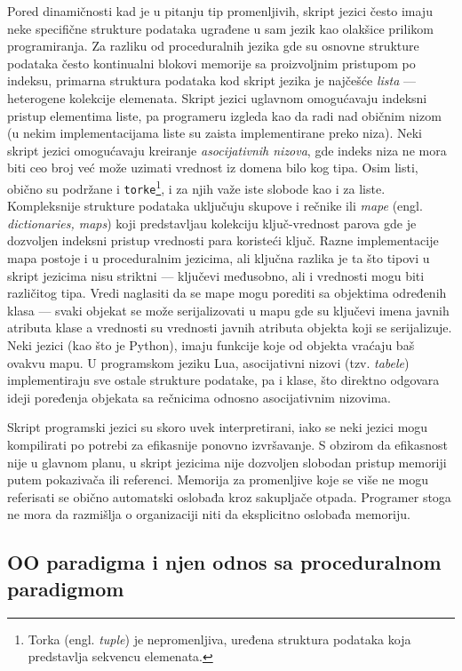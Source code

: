 Pored dinamičnosti kad je u pitanju tip promenljivih, skript jezici često imaju neke specifične strukture podataka ugrađene u sam jezik kao olakšice prilikom programiranja. Za razliku od proceduralnih jezika gde su osnovne strukture podataka često kontinualni blokovi memorije sa proizvoljnim pristupom po indeksu, primarna struktura podataka kod skript jezika je najčešće \emph{lista} --- heterogene kolekcije elemenata. Skript jezici uglavnom omogućavaju indeksni pristup elementima liste, pa programeru izgleda kao da radi nad običnim nizom (u nekim implementacijama liste su zaista implementirane preko niza). Neki skript jezici omogućavaju kreiranje \emph{asocijativnih nizova}, gde indeks niza ne mora biti ceo broj već može uzimati vrednost iz domena bilo kog tipa. Osim listi, obično su podržane i \texttt{torke}\footnote{Torka (engl. \emph{tuple}) je nepromenljiva, uređena struktura podataka koja predstavlja sekvencu elemenata.}, i za njih važe iste slobode kao i za liste. Kompleksnije strukture podataka uključuju skupove i rečnike ili \emph{mape} (engl. \emph{dictionaries, maps}) koji predstavljau kolekciju ključ-vrednost parova gde je dozvoljen indeksni pristup vrednosti para koristeći ključ. Razne implementacije mapa postoje i u proceduralnim jezicima, ali ključna razlika je ta što tipovi u skript jezicima nisu striktni --- ključevi međusobno, ali i vrednosti mogu biti različitog tipa. Vredi naglasiti da se mape mogu porediti sa objektima određenih klasa --- svaki objekat se može serijalizovati u mapu gde su ključevi imena javnih atributa klase a vrednosti su vrednosti javnih atributa objekta koji se serijalizuje. Neki jezici (kao što je Python), imaju funkcije koje od objekta vraćaju baš ovakvu mapu. U programskom jeziku Lua, asocijativni nizovi (tzv. \emph{tabele}) implementiraju sve ostale strukture podatake, pa i klase, što direktno odgovara ideji poređenja objekata sa rečnicima odnosno asocijativnim nizovima.

Skript programski jezici su skoro uvek interpretirani, iako se neki jezici mogu kompilirati po potrebi za efikasnije ponovno izvršavanje. S obzirom da efikasnost nije u glavnom planu, u skript jezicima nije dozvoljen slobodan pristup memoriji putem pokazivača ili referenci. Memorija za promenljive koje se više ne mogu referisati se obično automatski oslobađa kroz sakupljače otpada. Programer stoga ne mora da razmišlja o organizaciji niti da eksplicitno oslobađa memoriju.


\subsection{OO paradigma i njen odnos sa proceduralnom paradigmom}
\label{subsec:ParadigmOOP}

